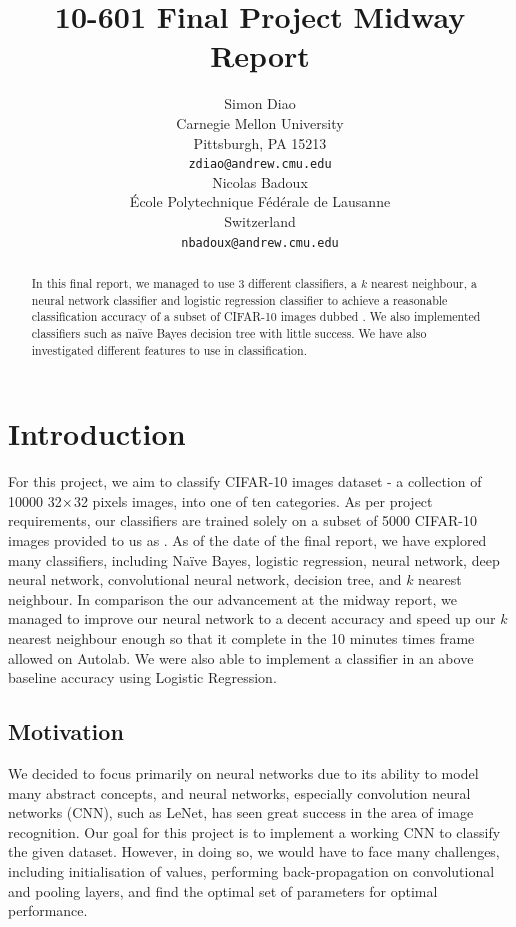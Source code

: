 \documentclass{article} %
\title{10-601 Final Project Midway Report}
\author{
Simon Diao\\
Carnegie Mellon University\\
Pittsburgh, PA 15213 \\
\texttt{zdiao@andrew.cmu.edu} \\
\And
Nicolas Badoux \\
\'Ecole Polytechnique F\'ed\'erale de Lausanne \\
Switzerland \\
\texttt{nbadoux@andrew.cmu.edu} \\
}
\begin{document}
\maketitle

\begin{abstract}
In this final report, we managed to use 3 different classifiers, a $k$ nearest neighbour, a neural network classifier and logistic regression classifier to achieve a reasonable classification accuracy of a subset of CIFAR-10 images dubbed . We also implemented classifiers such as na\"ive Bayes decision tree with little success. We have also investigated different features to use in classification.
\end{abstract}

\section{Introduction}

For this project, we aim to classify CIFAR-10 images dataset - a collection of 10000 32$\times$32 pixels images, into one of ten categories. As per project requirements,
our classifiers are trained solely on a subset of 5000 CIFAR-10 images provided to us as . As of the date of the final report, we have explored many
classifiers, including Na\"ive Bayes, logistic regression, neural network, deep neural network, convolutional neural network, decision tree, and $k$ nearest neighbour. 
In comparison the our advancement at the midway report, we managed to improve our neural network to a decent accuracy and speed up our $k$ nearest neighbour enough so that it complete in the 10 minutes times frame allowed on Autolab.  We were also able to implement a classifier in an above baseline accuracy using Logistic Regression.

\subsection{Motivation}

We decided to focus primarily on neural networks due to its ability to model many abstract concepts, and neural networks, especially convolution neural networks (CNN), such as LeNet,
has seen great success in the area of image recognition. Our goal for this project is to implement a working CNN to classify the given dataset. However, in doing so, we would have 
to face many challenges, including initialisation of values, performing back-propagation on convolutional and pooling layers, and find the optimal set of parameters for optimal
performance.
\end{document}
